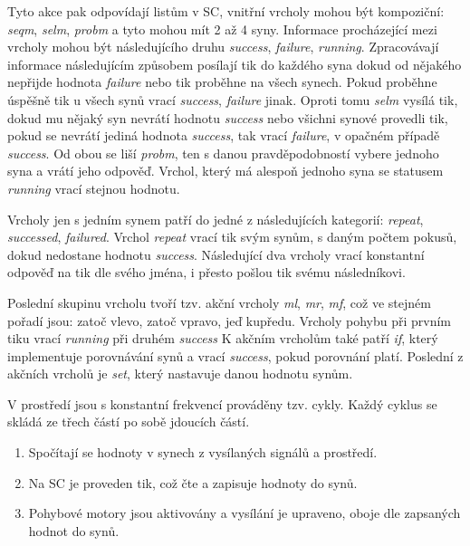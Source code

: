 \par
Tyto akce pak odpovídají listům v SC, vnitřní vrcholy mohou být kompoziční: \textit{seqm}, \textit{selm}, \textit{probm} a tyto mohou mít 2 až 4 syny. Informace procházející mezi vrcholy mohou být následujícího druhu \textit{success}, \textit{failure}, \textit{running}. Zpracovávají informace následujícím způsobem posílají tik do každého syna dokud od nějakého nepřijde hodnota \textit{failure} nebo tik proběhne na všech synech. Pokud proběhne úspěšně tik u všech synů vrací \textit{success}, \textit{failure} jinak. Oproti tomu \textit{selm} vysílá tik, dokud mu nějaký syn nevrátí hodnotu \textit{success} nebo všichni synové provedli tik, pokud se nevrátí jediná hodnota \textit{success}, tak vrací \textit{failure}, v opačném případě \textit{success}. Od obou se liší \textit{probm}, ten s danou pravděpodobností vybere jednoho syna a vrátí jeho odpověď. Vrchol, který má alespoň jednoho syna se statusem \textit{running} vrací stejnou hodnotu. \par
Vrcholy jen s jedním synem patří do jedné z následujících kategorií: \textit{repeat}, \textit{successed}, \textit{failured}. Vrchol \textit{repeat} vrací tik svým synům, s daným počtem pokusů, dokud nedostane hodnotu \textit{success}. Následující dva vrcholy vrací konstantní odpověď na tik dle svého jména, i přesto pošlou tik svému následníkovi. \par
Poslední skupinu vrcholu tvoří tzv. akční vrcholy \textit{ml}, \textit{mr}, \textit{mf}, což ve stejném pořadí jsou: zatoč vlevo, zatoč vpravo, jeď kupředu. Vrcholy pohybu při prvním tiku vrací \textit{running} při druhém \textit{success} K akčním vrcholům také patří \textit{if}, který implementuje porovnávání synů a vrací \textit{success}, pokud porovnání platí. Poslední z akčních vrcholů je \textit{set}, který nastavuje danou hodnotu synům. 
\par
V prostředí jsou s konstantní frekvencí prováděny tzv.  cykly. Každý cyklus se skládá ze třech částí po sobě jdoucích částí.  
\par
\begin{enumerate}
    \item Spočítají se hodnoty v synech z vysílaných signálů a prostředí. 
    \item Na SC je proveden tik, což čte a zapisuje hodnoty do synů. 
    \item Pohybové motory jsou aktivovány a vysílání je upraveno, oboje dle zapsaných hodnot do synů.
\end{enumerate}
\par 
